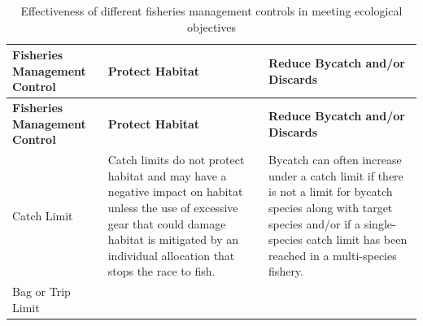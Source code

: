 \documentclass[]{book}
\begin{document}
\begin{longtable}[]{@{}lll@{}}
\caption{\label{tab:fmcs-eco} Effectiveness of different fisheries
management controls in meeting ecological objectives}\tabularnewline
\toprule
\begin{minipage}[b]{0.30\columnwidth}\raggedright\strut
\textbf{Fisheries Management Control}\strut
\end{minipage} & \begin{minipage}[b]{0.30\columnwidth}\raggedright\strut
\textbf{Protect Habitat}\strut
\end{minipage} & \begin{minipage}[b]{0.30\columnwidth}\raggedright\strut
\textbf{Reduce Bycatch and/or Discards}\strut
\end{minipage}\tabularnewline
\midrule
\endfirsthead
\toprule
\begin{minipage}[b]{0.30\columnwidth}\raggedright\strut
\textbf{Fisheries Management Control}\strut
\end{minipage} & \begin{minipage}[b]{0.30\columnwidth}\raggedright\strut
\textbf{Protect Habitat}\strut
\end{minipage} & \begin{minipage}[b]{0.30\columnwidth}\raggedright\strut
\textbf{Reduce Bycatch and/or Discards}\strut
\end{minipage}\tabularnewline
\midrule
\endhead
\begin{minipage}[t]{0.30\columnwidth}\raggedright\strut
Catch Limit\strut
\end{minipage} & \begin{minipage}[t]{0.30\columnwidth}\raggedright\strut
Catch limits do not protect habitat and may have a negative impact on
habitat unless the use of excessive gear that could damage habitat is
mitigated by an individual allocation that stops the race to fish.\strut
\end{minipage} & \begin{minipage}[t]{0.30\columnwidth}\raggedright\strut
Bycatch can often increase under a catch limit if there is not a limit
for bycatch species along with target species and/or if a single-species
catch limit has been reached in a multi-species fishery.\strut
\end{minipage}\tabularnewline
\begin{minipage}[t]{0.30\columnwidth}\raggedright\strut
Bag or Trip Limit\strut
\end{minipage} & \begin{minipage}[t]{0.30\columnwidth}\raggedright\strut

\end{minipage}
\end{longtable}
\end{document}
